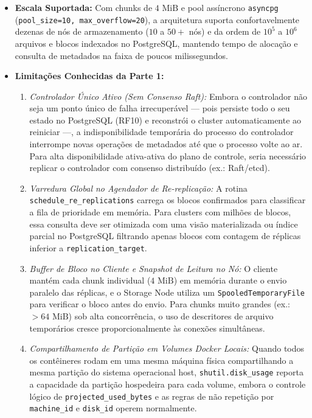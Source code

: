 \documentclass[10pt,a4paper]{article}
\begin{document}
\begin{itemize}
    \item \textbf{Escala Suportada:} Com chunks de $4\text{ MiB}$ e pool assíncrono \texttt{asyncpg} (\texttt{pool\_size=10, max\_overflow=20}), a arquitetura suporta confortavelmente dezenas de nós de armazenamento ($10$ a $50+$ nós) e da ordem de $10^5$ a $10^6$ arquivos e blocos indexados no PostgreSQL, mantendo tempo de alocação e consulta de metadados na faixa de poucos milissegundos.
    \item \textbf{Limitações Conhecidas da Parte 1:}
    \begin{enumerate}
        \item \textit{Controlador Único Ativo (Sem Consenso Raft):} Embora o controlador não seja um ponto único de falha irrecuperável — pois persiste todo o seu estado no PostgreSQL (RF10) e reconstrói o cluster automaticamente ao reiniciar —, a indisponibilidade temporária do processo do controlador interrompe novas operações de metadados até que o processo volte ao ar. Para alta disponibilidade ativa-ativa do plano de controle, seria necessário replicar o controlador com consenso distribuído (ex.: Raft/etcd).
        \item \textit{Varredura Global no Agendador de Re-replicação:} A rotina \texttt{schedule\_re\_replications} carrega os blocos confirmados para classificar a fila de prioridade em memória. Para clusters com milhões de blocos, essa consulta deve ser otimizada com uma visão materializada ou índice parcial no PostgreSQL filtrando apenas blocos com contagem de réplicas inferior a \texttt{replication\_target}.
        \item \textit{Buffer de Bloco no Cliente e Snapshot de Leitura no Nó:} O cliente mantém cada chunk individual ($4\text{ MiB}$) em memória durante o envio paralelo das réplicas, e o Storage Node utiliza um \texttt{SpooledTemporaryFile} para verificar o bloco antes do envio. Para chunks muito grandes (ex.: $>64\text{ MiB}$) sob alta concorrência, o uso de descritores de arquivo temporários cresce proporcionalmente às conexões simultâneas.
        \item \textit{Compartilhamento de Partição em Volumes Docker Locais:} Quando todos os contêineres rodam em uma mesma máquina física compartilhando a mesma partição do sistema operacional host, \texttt{shutil.disk\_usage} reporta a capacidade da partição hospedeira para cada volume, embora o controle lógico de \texttt{projected\_used\_bytes} e as regras de não repetição por \texttt{machine\_id} e \texttt{disk\_id} operem normalmente.
    \end{enumerate}
\end{itemize}
\end{document}

